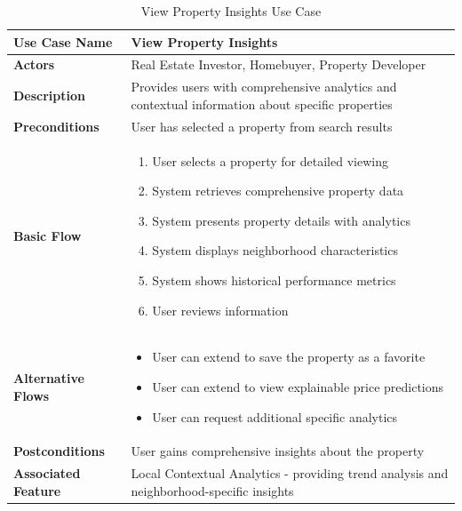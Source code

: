 \begin{table}[h]
	\centering
	\renewcommand{\arraystretch}{1.3}
	\begin{tabular}{|>{\columncolor[gray]{0.95}}p{}|p{}|}
		\hline
		\rowcolor[gray]{0.9} \textbf{Use Case Name} & \textbf{View Property Insights}                                                                  \\
		\hline
		\textbf{Actors}                             & Real Estate Investor, Homebuyer, Property Developer                                              \\
		\hline
		\textbf{Description}                        & Provides users with comprehensive analytics and contextual information about specific properties \\
		\hline
		\textbf{Preconditions}                      & User has selected a property from search results                                                 \\
		\hline
		\textbf{Basic Flow}                         &                                                                                                  
		\begin{enumerate}
		\item User selects a property for detailed viewing
		\item System retrieves comprehensive property data
		\item System presents property details with analytics
		\item System displays neighborhood characteristics
		\item System shows historical performance metrics
		\item User reviews information
		\end{enumerate} \\
		\hline
		\textbf{Alternative Flows}                  &                                                                                                  
		\begin{itemize}
		\item User can extend to save the property as a favorite
		\item User can extend to view explainable price predictions
		\item User can request additional specific analytics
		\end{itemize} \\
		\hline
		\textbf{Postconditions}                     & User gains comprehensive insights about the property                                             \\
		\hline
		\textbf{Associated Feature}                 & Local Contextual Analytics - providing trend analysis and neighborhood-specific insights         \\
		\hline
	\end{tabular}
	\caption{View Property Insights Use Case}
	\label{tab:insights-use-case}
\end{table}

